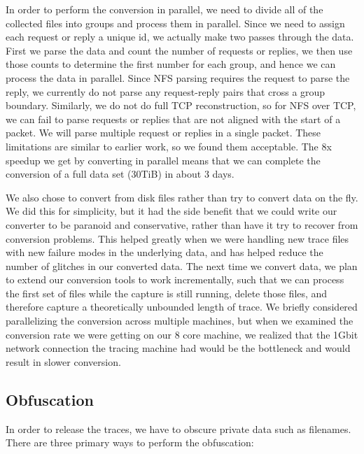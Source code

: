 In order to perform the conversion in parallel, we need to divide all
of the collected files into groups and process them in parallel.
Since we need to assign each request or reply a unique id, we actually
make two passes through the data.  First we parse the data and count
the number of requests or replies, we then use those counts to
determine the first number for each group, and hence we can process
the data in parallel.  Since NFS parsing requires the request to parse
the reply, we currently do not parse any request-reply pairs that
cross a group boundary.  Similarly, we do not do full TCP
reconstruction, so for NFS over TCP, we can fail to parse requests or
replies that are not aligned with the start of a packet.  We will
parse multiple request or replies in a single packet.  These
limitations are similar to earlier work, so we found them acceptable.
The 8x speedup we get by converting in parallel means that we can
complete the conversion of a full data set (30TiB) in about 3 days.

We also chose to convert from disk files rather than try to convert
data on the fly.  We did this for simplicity, but it had the side
benefit that we could write our converter to be paranoid and
conservative, rather than have it try to recover from conversion
problems.  This helped greatly when we were handling new trace files
with new failure modes in the underlying data, and has helped reduce
the number of glitches in our converted data.  The next time we
convert data, we plan to extend our conversion tools to work
incrementally, such that we can process the first set of files while
the capture is still running, delete those files, and therefore
capture a theoretically unbounded length of trace.  We briefly
considered parallelizing the conversion across multiple machines, but
when we examined the conversion rate we were getting on our 8 core
machine, we realized that the 1Gbit network connection the tracing
machine had would be the bottleneck and would result in slower
conversion.

\subsection{Obfuscation}

In order to release the traces, we have to obscure private data such
as filenames.  There are three primary ways to perform the obfuscation: 

